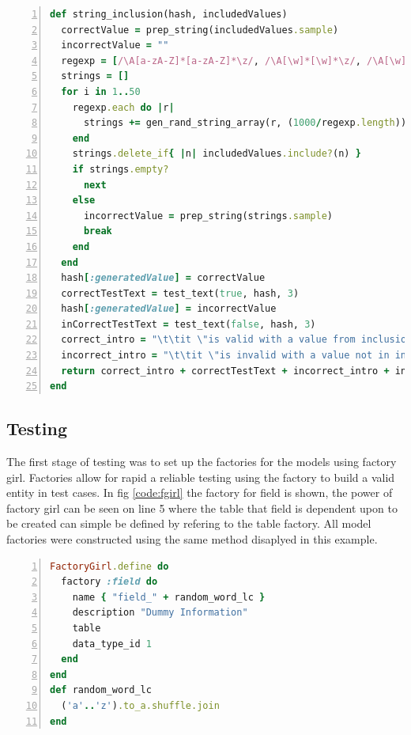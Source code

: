 \documentclass[a4paper,12pt]{article}
\begin{document}
\begin{lstlisting}[frame=single,numbers=left,language = ruby,caption= {generate\_tests\_for\_table}, label={code:strinc}]
def string_inclusion(hash, includedValues)
  correctValue = prep_string(includedValues.sample)
  incorrectValue = ""
  regexp = [/\A[a-zA-Z]*[a-zA-Z]*\z/, /\A[\w]*[\w]*\z/, /\A[\w]*[[:punct:]]*[\w]*\z/, /\A[\w]*[[:print:]]*[a-zA-Z]*\z/]
  strings = []
  for i in 1..50
    regexp.each do |r|
      strings += gen_rand_string_array(r, (1000/regexp.length))
    end
    strings.delete_if{ |n| includedValues.include?(n) }
    if strings.empty?
      next
    else
      incorrectValue = prep_string(strings.sample)
      break
    end
  end
  hash[:generatedValue] = correctValue
  correctTestText = test_text(true, hash, 3)
  hash[:generatedValue] = incorrectValue
  inCorrectTestText = test_text(false, hash, 3)
  correct_intro = "\t\tit \"is valid with a value from inclusion\" do\n"
  incorrect_intro = "\t\tit \"is invalid with a value not in inclusion\" do\n"
  return correct_intro + correctTestText + incorrect_intro + inCorrectTestText 
end
\end{lstlisting}

\subsection{Testing}

\par The first stage of testing was to set up the factories for the models using factory girl\cite{fgirl}. Factories allow for rapid a reliable testing using the factory to build a valid entity in test cases. In fig \ref{code:fgirl} the factory for field is shown, the power of factory girl can be seen on line 5 where the table that field is dependent upon to be created can simple be defined by refering to the table factory. All model factories were constructed using the same method disaplyed in this example.

\begin{lstlisting}[frame=single,numbers=left,language = ruby,caption= {Factory for field}, label={code:fgirl}]
FactoryGirl.define do
  factory :field do
    name { "field_" + random_word_lc }
    description "Dummy Information"
    table
    data_type_id 1
  end
end
def random_word_lc
  ('a'..'z').to_a.shuffle.join
end
\end{lstlisting}
\end{document}
